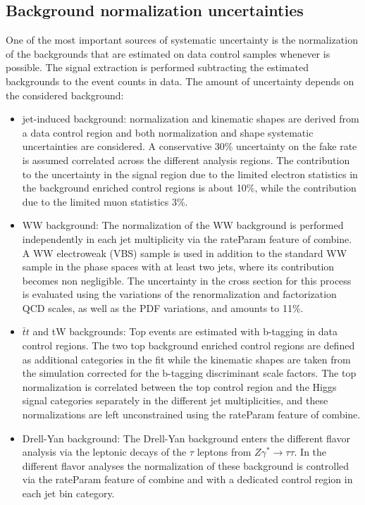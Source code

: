 \subsection*{Background normalization uncertainties}
One of the most important sources of systematic uncertainty is the normalization of the backgrounds that are estimated on data control samples whenever is possible. The signal extraction is performed subtracting the estimated backgrounds to the event counts in data. The amount of uncertainty depends on the considered background:
\begin{itemize}
\item  jet-induced background: normalization and kinematic shapes are derived from a
data control region and both normalization and shape systematic uncertainties are
considered. A conservative 30$\%$ uncertainty on the fake rate is assumed correlated across the different analysis regions. The contribution to the uncertainty in the signal region due to the limited electron statistics in the background enriched control regions is about 10\%, while the contribution due
to the limited muon statistics 3\%. 
\item WW background: The normalization of the WW background is performed independently in each jet multiplicity via the rateParam feature of combine. 
A WW electroweak (VBS) sample is used in addition to the standard WW sample in
the phase spaces with at least two jets, where its contribution becomes non negligible.
The uncertainty in the cross section for this process is evaluated using the variations
of the renormalization and factorization QCD scales, as well as the PDF variations,
and amounts to 11\%.
\item $\bar{t}t$ and tW backgrounds: Top events are estimated with b-tagging in data control regions. The two top background enriched control regions are defined as additional categories in the fit while the kinematic shapes are taken from the simulation corrected for the b-tagging discriminant scale factors. The top normalization is correlated between the top control region and the Higgs signal categories separately in
the different jet multiplicities, and these normalizations are left unconstrained using the rateParam feature of combine. 
\item Drell-Yan background: The Drell-Yan background enters the different flavor analysis via the leptonic decays of the $\tau$ leptons from $Z \gamma^* \to \tau \tau$. In the different flavor
analyses the normalization of these background is controlled via the rateParam
feature of combine and with a dedicated control region in each jet bin category. 


\end{itemize}
